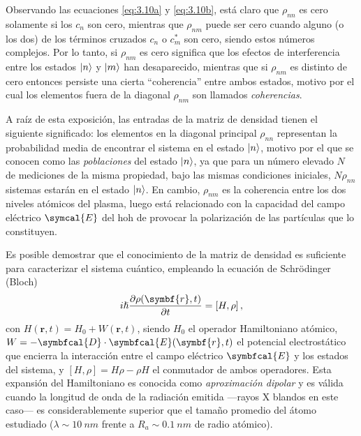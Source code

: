 Observando las ecuaciones \eqref{eq:3.10a} y \eqref{eq:3.10b}, está claro que $\rho_{nn}$ es cero solamente si los $c_{n}$ son cero, mientras que $\rho_{nm}$ puede ser cero cuando alguno (o los dos) de los términos cruzados $c_{n}$ o $c^{*}_{m}$ son cero, siendo estos números complejos. Por lo tanto, si $\rho_{nm}$ es cero significa que los efectos de interferencia entre los estados $|n\rangle$ y $|m\rangle$ han desaparecido, mientras que si $\rho_{nm}$ es distinto de cero entonces persiste una cierta \enquote{coherencia} entre ambos estados, motivo por el cual los elementos fuera de la diagonal $\rho_{nm}$ son llamados \emph{coherencias}.

A raíz de esta exposición, las entradas de la matriz de densidad tienen el siguiente significado: los elementos en la diagonal principal $\rho_{nn}$ representan la probabilidad media de encontrar el sistema en el estado $|n\rangle$, motivo por el que se conocen como las \emph{poblaciones} del estado $|n\rangle$, ya que para un número elevado $N$ de mediciones de la misma propiedad, bajo las mismas condiciones iniciales, $N \rho_{nn}$ sistemas estarán en el estado $|n\rangle$. En cambio, $\rho_{nm}$ es la coherencia entre los dos niveles atómicos del plasma, luego está relacionado con la capacidad del campo eléctrico $\symcal{E}$ del \acrshort{hoh} de provocar la polarización de las partículas que lo constituyen.

Es posible demostrar \autocite{Cohen-Tannoudji2019} que el conocimiento de la matriz de densidad es suficiente para caracterizar el sistema cuántico, empleando la ecuación de Schrödinger (Bloch)
\begin{equation}\label{eq:3.11}
  i \hslash \pdv{\rho(\symbf{r},t)}{t} = \left[H,\rho\right],
\end{equation}
con $H(\symbf{r},t) = H_{0} + W(\symbf{r},t)$, siendo $H_{0}$ el operador Hamiltoniano atómico, $W = -\symbfcal{D} \cdot \symbfcal{E}(\symbf{r},t)$ el potencial electrostático que encierra la interacción entre el campo eléctrico $\symbfcal{E}$ y los estados del sistema, y $\left[H, \rho\right] = H \rho - \rho H$ el conmutador de ambos operadores. Esta expansión del Hamiltoniano es conocida como \emph{aproximación dipolar} \autocite{Jackson1998} y es válida cuando la longitud de onda de la radiación emitida ---rayos X blandos en este caso--- es considerablemente superior que el tamaño promedio del átomo estudiado ($\lambda \sim \qty{10}{nm}$ frente a $R_{a} \sim \qty{0.1}{nm}$ de radio atómico). 


